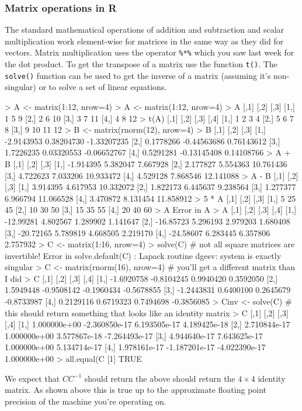 \subsubsection{Matrix operations in R}

The standard mathematical operations of addition and subtraction and
scalar multiplication work element-wise for matrices in the same way as
they did for vectors. Matrix multiplication uses the operator
\lstinline!%*%! which you saw last week for the dot product. To get the
transpose of a matrix use the function \lstinline!t()!. The
\lstinline!solve()! function can be used to get the inverse of a matrix
(assuming it's non-singular) or to solve a set of linear equations.

\begin{R}
> A <- matrix(1:12, nrow=4)
> A <- matrix(1:12, nrow=4)
> A
     [,1] [,2] [,3]
[1,]    1    5    9
[2,]    2    6   10
[3,]    3    7   11
[4,]    4    8   12
> t(A)
     [,1] [,2] [,3] [,4]
[1,]    1    2    3    4
[2,]    5    6    7    8
[3,]    9   10   11   12
> B <- matrix(rnorm(12), nrow=4)
> B
           [,1]        [,2]        [,3]
[1,] -2.9143953  0.38204730 -1.33207235
[2,]  0.1778266 -0.44563686  0.76143612
[3,]  1.7226235  0.03320553 -0.06652767
[4,]  0.5291281 -0.13145408  0.14108766
> A + B
          [,1]     [,2]      [,3]
[1,] -1.914395 5.382047  7.667928
[2,]  2.177827 5.554363 10.761436
[3,]  4.722623 7.033206 10.933472
[4,]  4.529128 7.868546 12.141088
> A - B
         [,1]     [,2]      [,3]
[1,] 3.914395 4.617953 10.332072
[2,] 1.822173 6.445637  9.238564
[3,] 1.277377 6.966794 11.066528
[4,] 3.470872 8.131454 11.858912
> 5 * A
     [,1] [,2] [,3]
[1,]    5   25   45
[2,]   10   30   50
[3,]   15   35   55
[4,]   20   40   60
> A %
Error in A %
> A %
          [,1]     [,2]     [,3]     [,4]
[1,] -12.99281 4.802567 1.289902 1.141647
[2,] -16.85723 5.296193 2.979203 1.680408
[3,] -20.72165 5.789819 4.668505 2.219170
[4,] -24.58607 6.283445 6.357806 2.757932
> C <- matrix(1:16, nrow=4)
> solve(C)  # not all square matrices are invertible!
Error in solve.default(C) : Lapack routine dgesv: system is exactly singular
> C <- matrix(rnorm(16), nrow=4)  # you'll get a different matrix than I did
> C
           [,1]       [,2]       [,3]       [,4]
[1,] -1.6920758 -0.8104245  0.9940420  0.3592050
[2,]  1.5949448 -0.9508142 -0.1960434 -0.5678855
[3,] -1.2443831  0.6400100  0.2645679 -0.8733987
[4,]  0.2129116  0.6719323  0.7494698 -0.3856085
> Cinv <- solve(C)  # this should return something that looks like an identity matrix
> C %
             [,1]          [,2]          [,3]          [,4]
[1,] 1.000000e+00 -2.360850e-17  6.193505e-17  4.189425e-18
[2,] 2.710844e-17  1.000000e+00  3.577867e-18 -7.264493e-17
[3,] 4.944640e-17  7.643625e-17  1.000000e+00  5.134714e-17
[4,] 1.978161e-17 -1.187201e-17 -4.022390e-17  1.000000e+00
> all.equal(C %
[1] TRUE
\end{R}


We expect that $CC^{-1}$ should return the above should return the
$4 \times 4$ identity matrix. As shown above this is true up to the
approximate floating point precision of the machine you're operating on.



